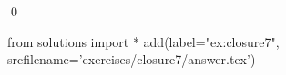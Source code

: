 
\begin{ex} 
  \label{ex:closure7}
  
  \qed
\end{ex} 
\begin{python0}
from solutions import *
add(label="ex:closure7",
    srcfilename='exercises/closure7/answer.tex') 
\end{python0}
